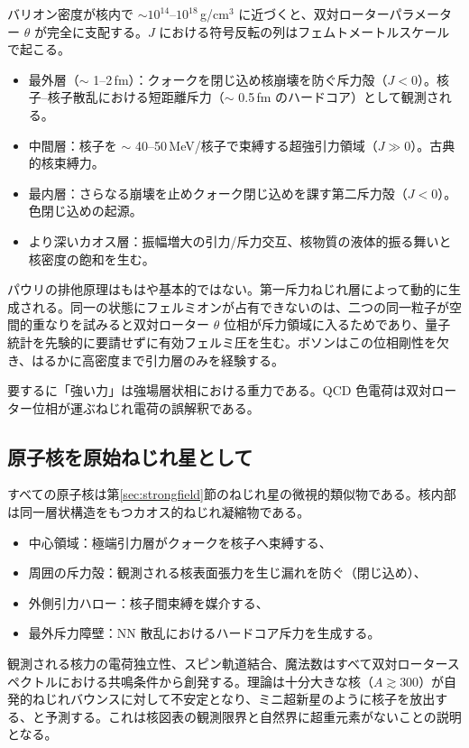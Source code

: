 \documentclass[a4paper]{article}
\begin{document}
バリオン密度が核内で $\sim 10^{14}$--$10^{18}$\,g/cm$^3$ に近づくと、双対ローターパラメーター $\theta$ が完全に支配する。$J$ における符号反転の列はフェムトメートルスケールで起こる。

\begin{itemize}
\item 最外層（$\sim$ 1--2\,fm）：クォークを閉じ込め核崩壊を防ぐ斥力殻（$J < 0$）。核子--核子散乱における短距離斥力（$\sim$ 0.5\,fm のハードコア）として観測される。
\item 中間層：核子を $\sim$ 40--50\,MeV/核子で束縛する超強引力領域（$J \gg 0$）。古典的核束縛力。
\item 最内層：さらなる崩壊を止めクォーク閉じ込めを課す第二斥力殻（$J < 0$）。色閉じ込めの起源。
\item より深いカオス層：振幅増大の引力/斥力交互、核物質の液体的振る舞いと核密度の飽和を生む。
\end{itemize}

パウリの排他原理はもはや基本的ではない。第一斥力ねじれ層によって動的に生成される。同一の状態にフェルミオンが占有できないのは、二つの同一粒子が空間的重なりを試みると双対ローター $\theta$ 位相が斥力領域に入るためであり、量子統計を先験的に要請せずに有効フェルミ圧を生む。ボソンはこの位相剛性を欠き、はるかに高密度まで引力層のみを経験する。

要するに「強い力」は強場層状相における重力である。QCD 色電荷は双対ローター位相が運ぶねじれ電荷の誤解釈である。

\subsection{原子核を原始ねじれ星として}

すべての原子核は第\ref{sec:strongfield}節のねじれ星の微視的類似物である。核内部は同一層状構造をもつカオス的ねじれ凝縮物である。

\begin{itemize}
\item 中心領域：極端引力層がクォークを核子へ束縛する、
\item 周囲の斥力殻：観測される核表面張力を生じ漏れを防ぐ（閉じ込め）、
\item 外側引力ハロー：核子間束縛を媒介する、
\item 最外斥力障壁：NN 散乱におけるハードコア斥力を生成する。
\end{itemize}

観測される核力の電荷独立性、スピン軌道結合、魔法数はすべて双対ロータースペクトルにおける共鳴条件から創発する。理論は十分大きな核（$A \gtrsim 300$）が自発的ねじれバウンスに対して不安定となり、ミニ超新星のように核子を放出する、と予測する。これは核図表の観測限界と自然界に超重元素がないことの説明となる。
\end{document}
